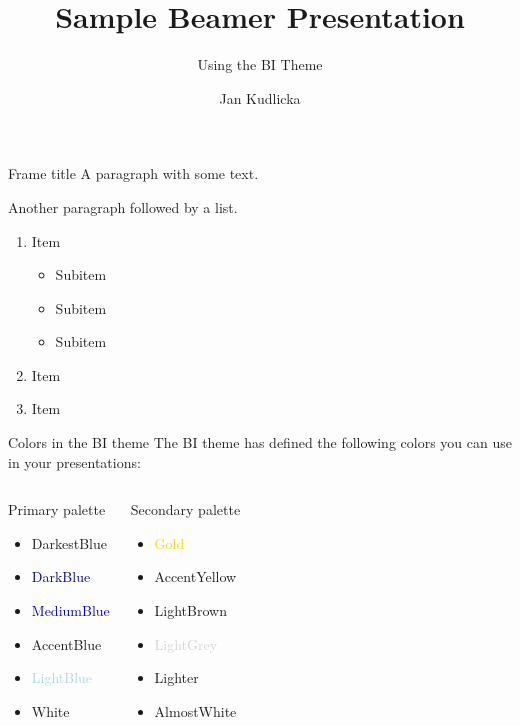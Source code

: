 \documentclass[aspectratio=169]{beamer}
\title{Sample Beamer Presentation}
\subtitle{Using the BI Theme}
\author{Jan Kudlicka}
\institute{BI Norwegian Business School}
\begin{document}
\maketitle


\begin{frame}{Frame title}
A paragraph with some text.

Another paragraph followed by a list.

\begin{enumerate}
\item Item
\begin{itemize}
\item{Subitem}
\item{Subitem}
\item{Subitem}
\end{itemize}
\item Item
\item Item
\end{enumerate}
\end{frame}


\begin{frame}{Colors in the BI theme}
The \alert{BI theme} has defined the following colors you can use in your presentations:

\begin{columns}[t]
\begin{block}{Primary palette}
\begin{itemize}
\item \textcolor{DarkestBlue}{DarkestBlue}
\item \textcolor{DarkBlue}{DarkBlue}
\item \textcolor{MediumBlue}{MediumBlue}
\item \textcolor{AccentBlue}{AccentBlue}
\item \textcolor{LightBlue}{LightBlue}
\item White
\end{itemize}
\end{block}
\begin{block}{Secondary palette}
\begin{itemize}
\item \textcolor{Gold}{Gold}
\item \textcolor{AccentYellow}{AccentYellow}
\item \textcolor{LightBrown}{LightBrown}
\item \textcolor{LightGrey}{LightGrey}
\item \textcolor{Lighter}{Lighter}
\item \textcolor{AlmostWhite}{AlmostWhite}
\end{itemize}
\end{block}
\end{columns}
\end{frame}
\end{document}
